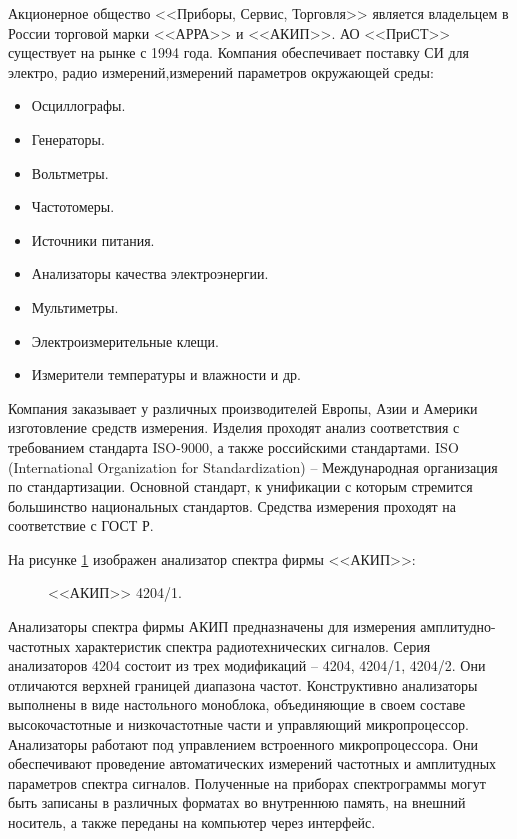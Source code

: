 Акционерное общество <<Приборы, Сервис, Торговля>> \cite{prist}  является владельцем в России торговой марки <<АРРА>> и <<АКИП>>.
АО <<ПриСТ>> существует на рынке с 1994 года.
Компания обеспечивает поставку СИ для электро, радио измерений,измерений параметров окружающей среды:
\begin{itemize}
	\item Осциллографы.
	\item Генераторы.
	\item Вольтметры.
	\item Частотомеры.
	\item Источники питания.
	\item Анализаторы качества электроэнергии.
	\item Мультиметры.
	\item Электроизмерительные клещи.
	\item Измерители температуры и влажности и др.
\end{itemize}

Компания заказывает у различных производителей Европы, Азии и Америки изготовление средств измерения. Изделия проходят анализ соответствия с требованием стандарта ISO-9000, а также российскими стандартами. ISO (International Organization for Standardization) -- Международная организация по стандартизации. Основной стандарт, к унификации с которым стремится большинство национальных стандартов. Средства измерения проходят на соответствие с ГОСТ Р. 

На рисунке \ref{fig:picture8} изображен анализатор спектра фирмы <<АКИП>>:

\begin{figure}[ht]
	\caption{<<АКИП>> 4204/1.}\label{fig:picture8}
\end{figure}

Анализаторы спектра фирмы АКИП предназначены для измерения амплитудно-частотных характеристик спектра радиотехнических сигналов. Серия анализаторов 4204 состоит из трех модификаций – 4204, 4204/1, 4204/2. Они отличаются верхней границей диапазона частот. Конструктивно анализаторы выполнены в виде настольного моноблока, объединяющие в своем составе высокочастотные и низкочастотные части и управляющий микропроцессор. Анализаторы работают под управлением встроенного микропроцессора. Они обеспечивают проведение автоматических измерений частотных и амплитудных параметров спектра сигналов. Полученные на приборах спектрограммы могут быть записаны в различных форматах во внутреннюю память, на внешний носитель, а также переданы на компьютер через интерфейс. 

